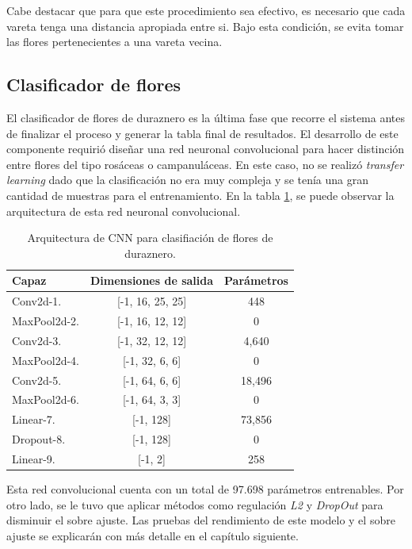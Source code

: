 Cabe destacar que para que este procedimiento sea efectivo, es necesario que cada vareta tenga una distancia apropiada entre si. Bajo esta condición, se evita tomar las flores pertenecientes a una vareta vecina. 

\subsection{Clasificador de flores}

El clasificador de flores de duraznero es la última fase que recorre el sistema antes de finalizar el proceso y generar la tabla final de resultados. El desarrollo de este componente requirió diseñar una red neuronal convolucional para hacer distinción entre flores del tipo rosáceas o campanuláceas. En este caso, no se realizó \textit{transfer learning} dado que la clasificación no era muy compleja y se tenía una gran cantidad de muestras para el entrenamiento. En la tabla \ref{tab:FlowerCNN}, se puede observar la arquitectura de esta red neuronal convolucional.

\begin{table}[h]
	\centering
	\caption{Arquitectura de CNN para clasifiación de flores de duraznero.}
	\begin{tabular}{l c c}    
		\toprule
		\textbf{Capaz}     & \textbf{Dimensiones de salida} & \textbf{Parámetros} \\
		\midrule
		Conv2d-1.          & [-1, 16, 25, 25] &  448\\
		MaxPool2d-2.       & [-1, 16, 12, 12] & 0\\
		Conv2d-3.          & [-1, 32, 12, 12] & 4,640 \\
		MaxPool2d-4.       & [-1, 32, 6, 6]   & 0 \\
		Conv2d-5.          & [-1, 64, 6, 6]   & 18,496 \\
		MaxPool2d-6.       & [-1, 64, 3, 3]   & 0 \\	
		Linear-7.          & [-1, 128]        & 73,856 \\
		Dropout-8.         & [-1, 128]        & 0 \\
		Linear-9.          & [-1, 2]          & 258 \\	
		\bottomrule
		\hline
	\end{tabular}
	\label{tab:FlowerCNN}
\end{table}  
\newpage
Esta red convolucional cuenta con un total de 97.698 parámetros entrenables. Por otro lado, se le tuvo que aplicar métodos como regulación \textit{L2} y \textit{DropOut} para disminuir el sobre ajuste. Las pruebas del rendimiento de este modelo y el sobre ajuste se explicarán con más detalle en el capítulo siguiente.

